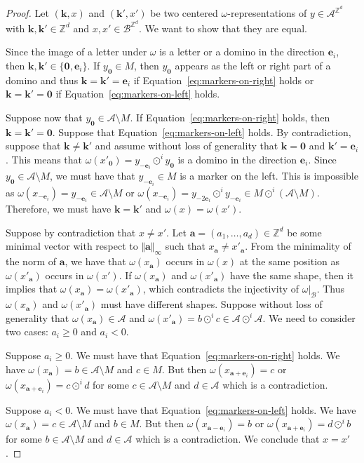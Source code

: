 \documentclass[12pt]{amsart}
\newcommand{\Z}{\mathbb{Z}}
\newcommand{\zero}{{\boldsymbol{0}}}
\newcommand{\ba}{{\boldsymbol{a}}}
\newcommand{\be}{{\boldsymbol{e}}}
\newcommand{\bk}{{\boldsymbol{k}}}
\newcommand{\Acal}{\mathcal{A}} %
\newcommand{\Bcal}{\mathcal{B}}
\begin{document}
\begin{proof}
    Let $(\bk,x)$ and $(\bk',x')$ be two
    centered $\omega$-representations of $y\in\Acal^{\Z^d}$ with
    $\bk,\bk'\in\Z^d$ and $x,x'\in\Bcal^{\Z^d}$.
    We want to show that they are equal.

    
    Since the image of a letter under $\omega$ is a letter or a domino in the
    direction $\be_i$, then $\bk,\bk'\in\{\zero,\be_i\}$.
    If $y_\zero\in M$, then $y_\zero$ appears as the left or right part of a
    domino and thus $\bk=\bk'=\be_i$
    if Equation~\eqref{eq:markers-on-right} holds
    or $\bk=\bk'=\zero$
    if Equation~\eqref{eq:markers-on-left} holds.

    Suppose now that $y_\zero\in \Acal\setminus M$. 
    If Equation~\eqref{eq:markers-on-right} holds,
    then $\bk=\bk'=\zero$.
    Suppose that Equation~\eqref{eq:markers-on-left} holds.
    By contradiction, suppose that $\bk\neq\bk'$ 
    and assume without loss of generality that
    $\bk=\zero$ and $\bk'=\be_i$.
    This means that $\omega(x'_\zero)=y_{-\be_i} \odot^i y_\zero$ is
    a domino in the direction $\be_i$. 
    Since $y_\zero\in \Acal\setminus M$, we must have that $y_{-\be_i}\in M$
    is a marker on the left.
    This is impossible as
    $\omega(x_{-\be_i})=y_{-\be_i}\in \Acal\setminus M$
    or
    $\omega(x_{-\be_i})=y_{-2\be_i} \odot^i y_{-\be_i}
    \in M\odot^i (\Acal\setminus M)$.
    Therefore, we must have $\bk=\bk'$ and
    $\omega(x)=\omega(x')$.

    Suppose by contradiction that $x\neq x'$.
    Let $\ba=(a_1,\dots,a_d)\in\Z^d$ be some minimal vector with respect to
    $\Vert\ba\Vert_\infty$ such that $x_\ba\neq x'_\ba$.
    From the minimality of the norm of $\ba$, we have that
    $\omega(x_\ba)$ occurs in $\omega(x)$
    at the same position as
    $\omega(x'_\ba)$ occurs in $\omega(x')$.
    If 
    $\omega(x_\ba)$ and
    $\omega(x'_\ba)$ have the same shape, then it implies
    that $\omega(x_\ba)=\omega(x'_\ba)$,
    which contradicts the injectivity of $\omega|_\Bcal$.
    Thus $\omega(x_\ba)$ and
    $\omega(x'_\ba)$ must have different shapes.
    Suppose without loss of generality that
    $\omega(x_\ba)\in\Acal $ and
    $\omega(x'_\ba)=b\odot^i c\in\Acal\odot^i\Acal$.
    We need to consider two cases: $a_i\geq 0$ and $a_i<0$.

    Suppose $a_i\geq 0$.
    We must have that Equation~\eqref{eq:markers-on-right} holds.
    We have $\omega(x_\ba)=b\in\Acal\setminus M$ and $c\in M$.
    But then $\omega(x_{\ba+\be_i})=c$
    or $\omega(x_{\ba+\be_i})=c\odot^i d$ for some 
    $c\in\Acal\setminus M$ and $d\in\Acal$ which is a contradiction.

    Suppose $a_i<0$.
    We must have that Equation~\eqref{eq:markers-on-left} holds.
    We have $\omega(x_\ba)=c\in\Acal\setminus M$ and $b\in M$.
    But then $\omega(x_{\ba-\be_i})=b$
    or $\omega(x_{\ba+\be_i})=d\odot^i b$ for some 
    $b\in\Acal\setminus M$ and
    $d\in\Acal$ which is a contradiction.
    We conclude that $x=x'$.
\end{proof}
\end{document}
